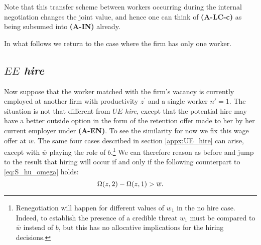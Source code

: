 Note that this transfer scheme between workers occurring during the internal negotiation changes the joint value, and hence one can think of \textbf{(A-LC-c)} as being subsumed into  \textbf{(A-IN)} already.

In what follows we return to the case where the firm has only one worker.

\subsection{\emph{$EE$ hire}}
Now suppose that the worker matched with the firm's vacancy is currently employed at another firm with productivity $z^{\prime}$ and a single worker $n'=1$.
The situation is not that different from \emph{$UE$ hire}, except that the potential hire may have a better outside option in the form of the retention offer made to her by her current employer under \textbf{(A-EN)}.
To see the similarity for now we fix this wage offer at $\overline{w}$.
The same four cases described in section \ref{appx:UE_hire} can arise, except with $\overline{w}$ playing the role of $b$.\footnote{Renegotiation will happen for different values of $w_1$ in the no hire case. Indeed, to establish the presence of a credible threat $w_1$ must be compared to $\overline{w}$ instead of $b$, but this has no allocative implications for the hiring decisions.}
We can therefore reason as before and jump to the result that hiring will occur if and only if the following counterpart to \eqref{eq:S_hu_omega} holds:
\vspace*{-.3cm}\begin{equation*}
\Omega(z,2) - \Omega(z,1) > \overline{w}.
\vspace*{-.3cm}\end{equation*}

